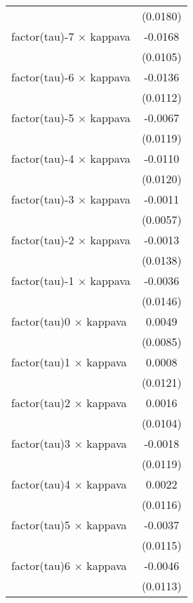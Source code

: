 \begin{tabular}{lc}
                                   & (0.0180)\\   
   factor(tau)-7 $\times$ kappava  & -0.0168\\   
                                   & (0.0105)\\   
   factor(tau)-6 $\times$ kappava  & -0.0136\\   
                                   & (0.0112)\\   
   factor(tau)-5 $\times$ kappava  & -0.0067\\   
                                   & (0.0119)\\   
   factor(tau)-4 $\times$ kappava  & -0.0110\\   
                                   & (0.0120)\\   
   factor(tau)-3 $\times$ kappava  & -0.0011\\   
                                   & (0.0057)\\   
   factor(tau)-2 $\times$ kappava  & -0.0013\\   
                                   & (0.0138)\\   
   factor(tau)-1 $\times$ kappava  & -0.0036\\   
                                   & (0.0146)\\   
   factor(tau)0 $\times$ kappava   & 0.0049\\   
                                   & (0.0085)\\   
   factor(tau)1 $\times$ kappava   & 0.0008\\   
                                   & (0.0121)\\   
   factor(tau)2 $\times$ kappava   & 0.0016\\   
                                   & (0.0104)\\   
   factor(tau)3 $\times$ kappava   & -0.0018\\   
                                   & (0.0119)\\   
   factor(tau)4 $\times$ kappava   & 0.0022\\   
                                   & (0.0116)\\   
   factor(tau)5 $\times$ kappava   & -0.0037\\   
                                   & (0.0115)\\   
   factor(tau)6 $\times$ kappava   & -0.0046\\   
                                   & (0.0113)\\   

\end{tabular}
